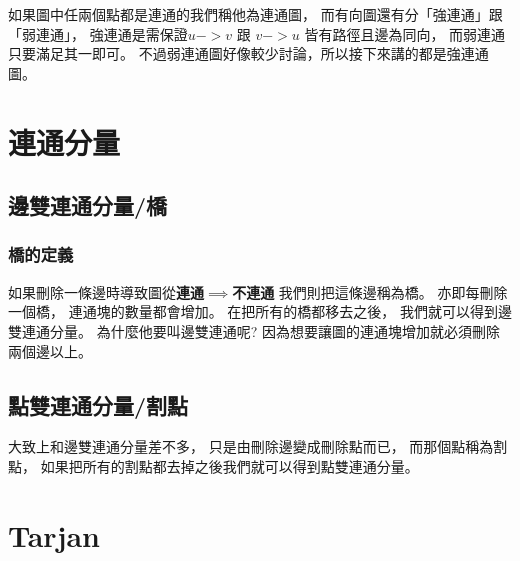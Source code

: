 \documentclass[12pt,oneside]{article}
\begin{document}
\begin{adjustwidth}{2em}{0em}
如果圖中任兩個點都是連通的我們稱他為連通圖，
而有向圖還有分「強連通」跟「弱連通」，
強連通是需保證$u -> v$ 跟 $v -> u $ 皆有路徑且邊為同向，
而弱連通只要滿足其一即可。
不過弱連通圖好像較少討論，所以接下來講的都是強連通圖。
\end{adjustwidth}





\section{連通分量}
\subsection{邊雙連通分量/橋}
\subsubsection*{橋的定義}
\begin{adjustwidth}{2em}{0em}
如果刪除一條邊時導致圖從\textbf{連通}$\implies$\textbf{不連通} 
我們則把這條邊稱為橋。
亦即每刪除一個橋，
連通塊的數量都會增加。
在把所有的橋都移去之後，
我們就可以得到邊雙連通分量。
為什麼他要叫邊雙連通呢?
因為想要讓圖的連通塊增加就必須刪除兩個邊以上。
\end{adjustwidth}



\subsection{點雙連通分量/割點}

\begin{adjustwidth}{2em}{0em}
大致上和邊雙連通分量差不多，
只是由刪除邊變成刪除點而已，
而那個點稱為割點，
如果把所有的割點都去掉之後我們就可以得到點雙連通分量。
\end{adjustwidth}



\clearpage
\section{Tarjan}
\end{document}
